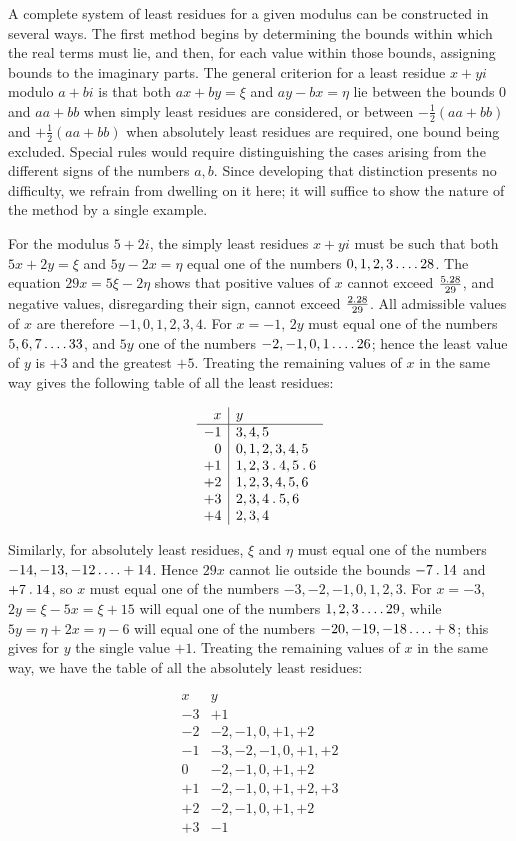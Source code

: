A complete system of least residues for a given modulus can be constructed in several ways. The first method begins by determining the bounds within which the real terms must lie, and then, for each value within those bounds, assigning bounds to the imaginary parts. The general criterion for a least residue $x+yi$ modulo $a+bi$ is that both $ax+by=\xi$ and $ay-bx=\eta$ lie between the bounds $0$ and $aa+bb$ when simply least residues are considered, or between $-\frac12(aa+bb)$ and $+\frac12(aa+bb)$ when absolutely least residues are required, one bound being excluded. Special rules would require distinguishing the cases arising from the different signs of the numbers $a,b$. Since developing that distinction presents no difficulty, we refrain from dwelling on it here; it will suffice to show the nature of the method by a single example.

For the modulus $5+2i$, the simply least residues $x+yi$ must be such that both $5x+2y=\xi$ and $5y-2x=\eta$ equal one of the numbers $0,1,2,3\mathinner{.\,.\,.\,.}28$. The equation $29x=5\xi-2\eta$ shows that positive values of $x$ cannot exceed $\frac{5\mathbin{.}28}{29}$, and negative values, disregarding their sign, cannot exceed $\frac{2\mathbin{.}28}{29}$. All admissible values of $x$ are therefore $-1,0,1,2,3,4$. For $x=-1$, $2y$ must equal one of the numbers $5,6,7\mathinner{.\,.\,.\,.}33$, and $5y$ one of the numbers $-2,-1,0,1\mathinner{.\,.\,.\,.}26$; hence the least value of $y$ is $+3$ and the greatest $+5$. Treating the remaining values of $x$ in the same way gives the following table of all the least residues:

%
\[
\begin{array}{r|l}
x&y\\\hline
-1&3,4,5\\
0&0,1,2,3,4,5\\
+1&1,2,3\mathbin{.}4,5\mathbin{.}6\\
+2&1,2,3,4,5,6\\
+3&2,3,4\mathbin{.}5,6\\
+4&2,3,4
\end{array}
\]

Similarly, for absolutely least residues, $\xi$ and $\eta$ must equal one of the numbers $-14,-13,-12\mathinner{.\,.\,.\,.}+14$. Hence $29x$ cannot lie outside the bounds $-7\mathbin{.}14$ and $+7\mathbin{.}14$, so $x$ must equal one of the numbers $-3,-2,-1,0,1,2,3$. For $x=-3$, $2y=\xi-5x=\xi+15$ will equal one of the numbers $1,2,3\mathinner{.\,.\,.\,.}29$, while $5y=\eta+2x=\eta-6$ will equal one of the numbers $-20,-19,-18\mathinner{.\,.\,.\,.}+8$; this gives for $y$ the single value $+1$. Treating the remaining values of $x$ in the same way, we have the table of all the absolutely least residues:

\[
\begin{array}{r|l}
x&y\\\hline
-3&+1\\
-2&-2,-1,0,+1,+2\\
-1&-3,-2,-1,0,+1,+2\\
0&-2,-1,0,+1,+2\\
+1&-2,-1,0,+1,+2,+3\\
+2&-2,-1,0,+1,+2\\
+3&-1
\end{array}
\]


